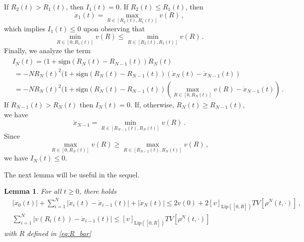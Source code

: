 \documentclass[reqno,oneside]{amsart}
\theoremstyle{plain}
\newtheorem{lemma}{Lemma}[section]
\begin{document}
If $R_2(t)>R_1(t)$, then $I_1(t)=0$. If $R_2(t)\leq R_1(t)$, then
\[\dot{x}_1(t)=\max_{R\in[R_2(t),R_1(t)]}v(R)\,,\]
which implies $I_1(t)\leq 0$ upon observing that
\[\min_{R\in[0,R_1(t)]}v(R)\leq \min_{R\in[R_2(t),R_1(t)]}v(R)\,.\]
Finally, we analyze the term 
\begin{align*}
    & I_N(t)=(1+\mathrm{sign}(R_N(t)-R_{N-1}(t))\dot{R}_N(t)\\
    & \ = -NR_N(t)^2(1+\mathrm{sign}(R_N(t)-R_{N-1}(t))(\dot{x}_N(t)-\dot{x}_{N-1}(t))\\
    & \ = -NR_N(t)^2(1+\mathrm{sign}(R_N(t)-R_{N-1}(t))(\max_{R\in [0,R_N(t)]}v(R)-\dot{x}_{N-1}(t))\,.
\end{align*}
If $R_{N-1}(t)>R_N(t)$ then $I_N(t)=0$. If, otherwise, $R_N(t)\geq R_{N-1}(t)$, we have
\[\dot{x}_{N-1}=\min_{R\in [R_{N-1}(t),R_N(t)]}v(R)\,.\]
Since
\[\max_{R\in [0,R_N(t)]}v(R)\geq \max_{R\in [R_{N-1}(t),R_N(t)]}v(R)\,,\]
we have $I_N(t)\leq 0$.
\endproof

The next lemma will be useful in the sequel.
\begin{lemma}
    For all $t\geq 0$, there holds
    \begin{align}
       & |\dot{x}_0(t)|+\sum_{i=1}^N|\dot{x}_i(t)-\dot{x}_{i-1}(t)| + |\dot{x}_N(t)|\leq 2v(0)+2[v]_{\mathrm{Lip}([0,\overline{R}])} TV[\rho^N(t,\cdot)]\,,\label{eq:est_vel_BV}\\
       & \sum_{i=1}^N|v(R_i(t))-\dot{x}_{i-1}(t)|\leq [v]_{\mathrm{Lip}([0,\overline{R}])}TV[\rho^N(t,\cdot)]\label{eq:est_vel_BV_2}
    \end{align}
with $\overline{R}$ defined in \eqref{eq:R_bar}
\end{lemma}
\end{document}
